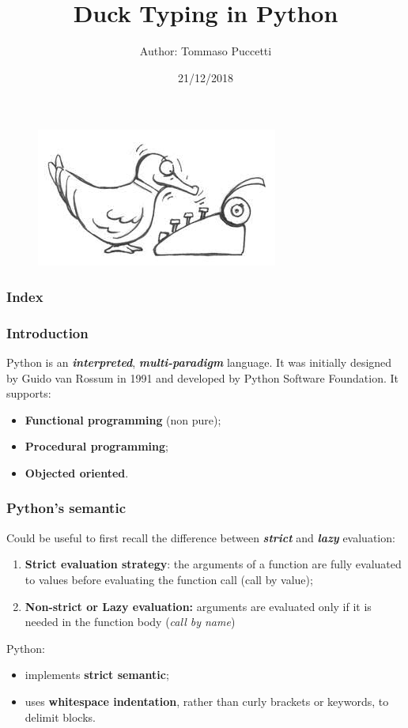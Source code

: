 \documentclass[xcolor ={table,usenames,dvipsnames}]{beamer}
\title{Duck Typing in Python}
\author{Author: Tommaso Puccetti}
\institute{Universit\`a  degli Studi di Firenze}
\date{21/12/2018}
\theoremstyle{definition}
\begin{document}
	
	\begin{frame}
		\maketitle
			\begin{figure}[h!]
			\centering
			\includegraphics[scale=2]{img/cartoonduck.jpg}
			\label{Interfacce di un CS}
		\end{figure}
	\end{frame}

	\begin{frame}
		\frametitle{Index}
		
	\end{frame}

	\begin{frame}
		\frametitle{Introduction}
		Python is an \textit{\textbf{interpreted}}, \textit{\textbf{multi-paradigm}} language. It was initially designed by Guido van Rossum in 1991 and developed by Python Software Foundation. It supports:
		\begin{itemize}
			\item \textbf{Functional programming } (non pure);
			\item \textbf{Procedural programming};
			\item \textbf{Objected oriented}.
		\end{itemize}
	\end{frame}

	\begin{frame}
		\frametitle{Python's semantic}
			Could be useful to first recall the difference between \textit{\textbf{strict}} and \textit{\textbf{lazy}} evaluation:
			\begin{enumerate}
				\item \textbf{Strict evaluation strategy}: the arguments of a function are fully evaluated to values before evaluating the function call (call by value);
				\item \textbf{Non-strict or Lazy evaluation:} arguments are evaluated only if it is needed in the function body (\textit{call by name})
			\end{enumerate}
			Python:		
			\begin{itemize}
				\item implements \textbf{strict semantic};
				\item uses \textbf{whitespace indentation}, rather than curly brackets or keywords, to delimit blocks.
			\end{itemize}
	\end{frame}
\end{document}
